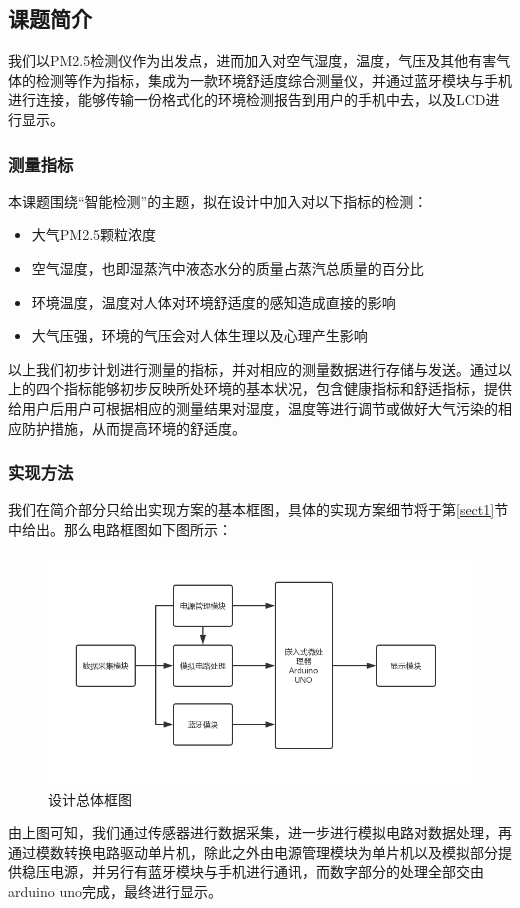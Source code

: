 \documentclass[a4paper, 11pt]{article} %
\begin{document}
\subsection{课题简介}
\par{} 我们以PM2.5检测仪作为出发点，进而加入对空气湿度，温度，气压及其他有害气体的检测等作为指标，集成为一款环境舒适度综合测量仪，并通过蓝牙模块与手机进行连接，能够传输一份格式化的环境检测报告到用户的手机中去，以及LCD进行显示。
\subsubsection{测量指标}
\par{} 本课题围绕“智能检测”的主题，拟在设计中加入对以下指标的检测：
\begin{itemize}
    \item 大气PM2.5颗粒浓度
    \item 空气湿度，也即湿蒸汽中液态水分的质量占蒸汽总质量的百分比
    \item 环境温度，温度对人体对环境舒适度的感知造成直接的影响
    \item 大气压强，环境的气压会对人体生理以及心理产生影响
\end{itemize}
\par{} 以上我们初步计划进行测量的指标，并对相应的测量数据进行存储与发送。通过以上的四个指标能够初步反映所处环境的基本状况，包含健康指标和舒适指标，提供给用户后用户可根据相应的测量结果对湿度，温度等进行调节或做好大气污染的相应防护措施，从而提高环境的舒适度。


\subsubsection{实现方法}
\par{} 我们在简介部分只给出实现方案的基本框图，具体的实现方案细节将于第\ref{sect1}节中给出。那么电路框图如下图所示：
\begin{figure}[H]
    \centering
    \includegraphics[scale = 0.58 ]{1-1.png}
    \caption{设计总体框图}
    \label{img1} 
  \end{figure}
\par{} 由上图可知，我们通过传感器进行数据采集，进一步进行模拟电路对数据处理，再通过模数转换电路驱动单片机，除此之外由电源管理模块为单片机以及模拟部分提供稳压电源，并另行有蓝牙模块与手机进行通讯，而数字部分的处理全部交由arduino uno完成，最终进行显示。
\end{document}
